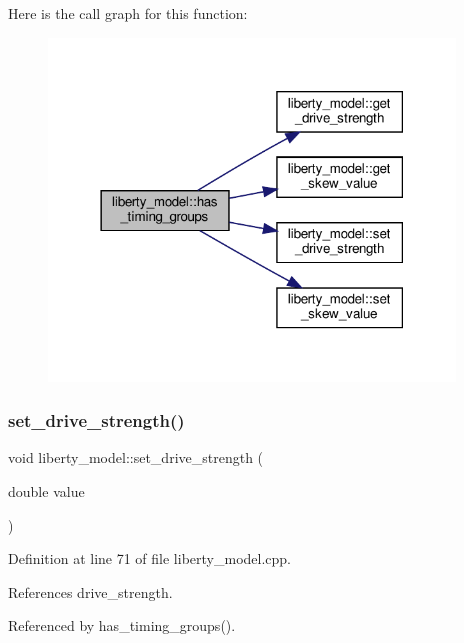 Here is the call graph for this function\+:
\nopagebreak
\begin{figure}[H]
\begin{center}
\leavevmode
\includegraphics[width=306pt]{d0/dae/classliberty__model_ab2955a2bc5546c99fa44092e349cd20e_cgraph}
\end{center}
\end{figure}
\mbox{\label{classliberty__model_a7733787e96dda82f8b979f6d8d384e70}} 
\subsubsection{\texorpdfstring{set\+\_\+drive\+\_\+strength()}{set\_drive\_strength()}}
{\footnotesize\ttfamily void liberty\+\_\+model\+::set\+\_\+drive\+\_\+strength (\begin{DoxyParamCaption}\item[{double}]{value }\end{DoxyParamCaption})}



Definition at line 71 of file liberty\+\_\+model.\+cpp.



References drive\+\_\+strength.



Referenced by has\+\_\+timing\+\_\+groups().

